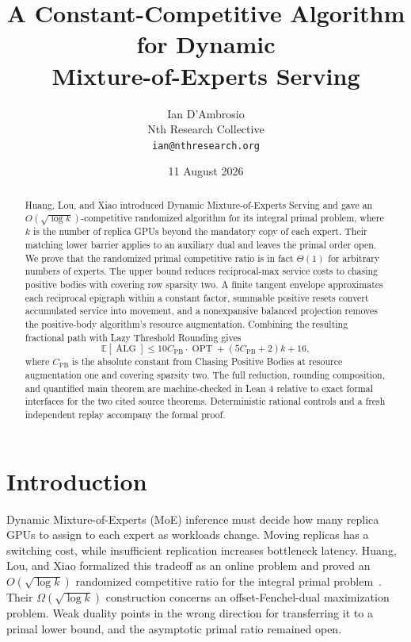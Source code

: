 \documentclass[11pt]{article}
\title{A Constant-Competitive Algorithm for Dynamic\\
Mixture-of-Experts Serving}
\author{Ian D'Ambrosio\\
\small Nth Research Collective\\
\small \texttt{ian@nthresearch.org}}
\date{11 August 2026}
\theoremstyle{remark}
\newcommand{\E}{\mathbb E}
\newcommand{\OPT}{\operatorname{OPT}}
\newcommand{\ALG}{\operatorname{ALG}}
\newcommand{\CPB}{C_{\mathrm{PB}}}
\begin{document}
\maketitle

\begin{abstract}
Huang, Lou, and Xiao introduced Dynamic Mixture-of-Experts Serving and gave an
\mbox{$O(\sqrt{\log k})$}-competitive randomized algorithm for its integral primal
problem, where $k$ is the number of replica GPUs beyond the mandatory copy of
each expert.  Their matching lower barrier applies to an auxiliary dual and
leaves the primal order open.  We prove that the randomized primal competitive
ratio is in fact $\Theta(1)$ for arbitrary numbers of experts.  The upper bound
reduces reciprocal-max service costs to chasing positive bodies with covering
row sparsity two.  A finite tangent envelope approximates each reciprocal
epigraph within a constant factor, summable positive resets convert accumulated
service into movement, and a nonexpansive balanced projection removes the
positive-body algorithm's resource augmentation.  Combining the resulting
fractional path with Lazy Threshold Rounding gives
\[
 \E[\ALG]\leq 10\CPB\cdot\OPT
   +(5\CPB+2)k+16,
\]
where $\CPB$ is the absolute constant from Chasing Positive Bodies at resource
augmentation one and covering sparsity two.  The full reduction, rounding
composition, and quantified main theorem are machine-checked in Lean 4 relative
to exact formal interfaces for the two cited source theorems.
Deterministic rational controls and a fresh independent replay accompany the
formal proof.
\end{abstract}

\section{Introduction}

Dynamic Mixture-of-Experts (MoE) inference must decide how many replica GPUs to
assign to each expert as workloads change.  Moving replicas has a switching
cost, while insufficient replication increases bottleneck latency.  Huang,
Lou, and Xiao formalized this tradeoff as an online problem and proved an
\mbox{$O(\sqrt{\log k})$} randomized competitive ratio for the integral primal
problem~\cite{HLX2026}.  Their \mbox{$\Omega(\sqrt{\log k})$} construction concerns an
offset-Fenchel-dual maximization problem.  Weak duality points in the wrong
direction for transferring it to a primal lower bound, and the asymptotic
primal ratio remained open.
\end{document}
